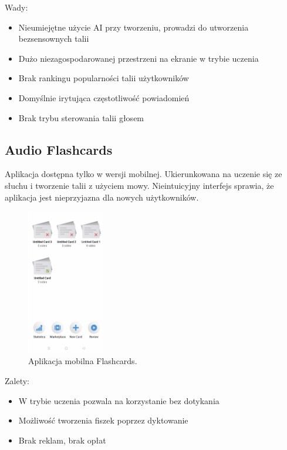 Wady:
\begin{itemize}
    \item Nieumiejętne użycie AI przy tworzeniu, prowadzi do utworzenia bezsensownych talii
    \item Dużo niezagospodarowanej przestrzeni na ekranie w trybie uczenia
    \item Brak rankingu popularności talii użytkowników
    \item Domyślnie irytująca częstotliwość powiadomień
    \item Brak trybu sterowania talii głosem
\end{itemize}

\subsection{Audio Flashcards}

Aplikacja dostępna tylko w wersji mobilnej. Ukierunkowana na uczenie się ze słuchu i tworzenie talii z użyciem mowy. Nieintuicyjny interfejs sprawia, że aplikacja jest nieprzyjazna dla nowych użytkowników.

\begin{figure}[H]
    \centering
    \includegraphics[width=0.3\textwidth]{chapters/chapter_3/flashcards.png}
    \caption{Aplikacja mobilna Flashcards.}
    \label{img:flashcards}
\end{figure}

Zalety:
\begin{itemize}
    \item W trybie uczenia pozwala na korzystanie bez dotykania
    \item Możliwość tworzenia fiszek poprzez dyktowanie
    \item Brak reklam, brak opłat
\end{itemize}

